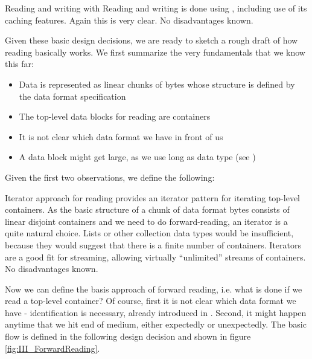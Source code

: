 {%
Reading and writing with \COMPmedia{}
}
{%
Reading and writing is done using \COMPmedia{}, including use of its caching features.
}
{%
Again this is very clear.
}
{%
No disadvantages known.
}

Given these basic design decisions, we are ready to sketch a rough draft of how reading basically works. We first summarize the very fundamentals that we know this far:
\begin{itemize}
\item Data is represented as linear chunks of bytes whose structure is defined by the data format specification
\item The top-level data blocks for reading are containers
\item It is not clear which data format we have in front of us
\item A data block might get large, as we use long as data type (see )
\end{itemize}

Given the first two observations, we define the following:

{%
Iterator approach for reading
}
{%
  \LibName{} provides an iterator pattern for iterating top-level containers.
}
{%
As the basic structure of a chunk of data format bytes consists of linear disjoint containers and we need to do forward-reading, an iterator is a quite natural choice. Lists or other collection data types would be insufficient, because they would suggest that there is a finite number of containers. Iterators are a good fit for streaming, allowing virtually ``unlimited'' streams of containers.
}
{%
No disadvantages known.
}

Now we can define the basis approach of forward reading, i.e. what is done if we read a top-level container? Of course, first it is not clear which data format we have - identification is necessary, already introduced in . Second, it might happen anytime that we hit end of medium, either expectedly or unexpectedly. The basic flow is defined in the following design decision and shown in figure \ref{fig:III_ForwardReading}.

